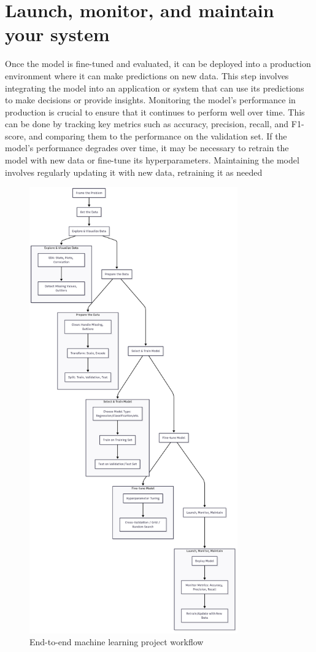 \documentclass{article}
\begin{document}
\section{Launch, monitor, and maintain your system}
Once the model is fine-tuned and evaluated, it can be deployed into a production environment where it can make predictions on new data. This step involves integrating the model into an application or system that can use its predictions to make decisions or provide insights.
Monitoring the model's performance in production is crucial to ensure that it continues to perform well over time. This can be done by tracking key metrics such as accuracy, precision, recall, and F1-score, and comparing them to the performance on the validation set. If the model's performance degrades over time, it may be necessary to retrain the model with new data or fine-tune its hyperparameters.
Maintaining the model involves regularly updating it with new data, retraining it as needed
\begin{figure}[ht]
    \centering
    \includegraphics[width=0.8\textwidth]{chart.png}
    \caption{End-to-end machine learning project workflow}
    \label{fig:mlworkflow}
\end{figure}
\end{document}
